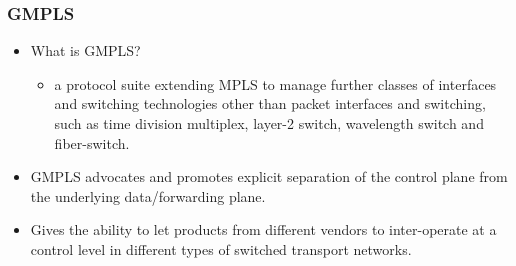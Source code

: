 \documentclass[12pt]{beamer}
\begin{document}

\begin{frame}
  \frametitle{GMPLS}

  \begin{itemize}
  \item What is GMPLS?
  	\begin{itemize}
  		\item  a protocol suite extending MPLS to manage further classes of interfaces and switching technologies other than packet interfaces and switching, such as time division multiplex, layer-2 switch, wavelength switch and fiber-switch.
  	\end{itemize}
  \item GMPLS advocates and promotes explicit separation of the control plane from the underlying data/forwarding plane.
  \item Gives the ability to let products from different vendors to inter-operate at a control level in different types of switched transport networks.

  \end{itemize}
\end{frame}
\end{document}
